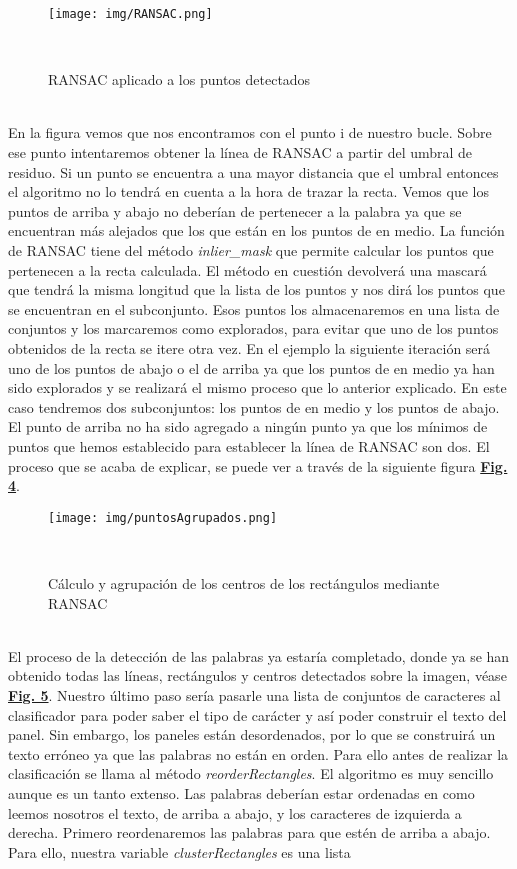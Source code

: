\documentclass[a4paper, 12pt]{article}
\begin{document}
\begin{figure}[h]
	\centering
	\texttt{[image: img/RANSAC.png]}
 	\caption{RANSAC aplicado a los puntos detectados}\
	\label{fig:normalizacion}
\end{figure}
\\ En la figura vemos que nos encontramos con el punto i de nuestro bucle. Sobre ese punto intentaremos obtener la línea de RANSAC a partir del umbral de residuo. Si un punto se encuentra a una mayor distancia que el umbral entonces el algoritmo no lo tendrá en cuenta a la hora de trazar la recta. Vemos que los puntos de arriba y abajo no deberían de pertenecer a la palabra ya que se encuentran más alejados que los que están en los puntos de en medio. La función de RANSAC tiene del método \textit{inlier\_mask} que permite calcular los puntos que pertenecen a la recta calculada. El método en cuestión devolverá una mascará que tendrá la misma longitud que la lista de los puntos y nos dirá  los puntos que se encuentran en el subconjunto. Esos puntos los almacenaremos en una lista de conjuntos y los marcaremos como explorados, para evitar que uno de los puntos obtenidos de la recta se itere otra vez. En el ejemplo la siguiente iteración será uno de los puntos de abajo o el de arriba ya que los puntos de en medio ya han sido explorados y se realizará el mismo proceso que lo anterior explicado. En este caso tendremos dos subconjuntos: los puntos de en medio y los puntos de abajo. El punto de arriba no ha sido agregado a ningún punto ya que los mínimos de puntos que hemos establecido para establecer la línea de RANSAC son dos. El proceso que se acaba de explicar, se puede ver a través de la siguiente figura \textbf{\hyperref[fig:puntosAgrupados]{Fig. 4}}.
\begin{figure}[h]
	\centering
	\texttt{[image: img/puntosAgrupados.png]}
 	\caption{Cálculo y agrupación de los centros de los rectángulos mediante RANSAC}\
	\label{fig:puntosAgrupados}
\end{figure}
\\El proceso de la detección de las palabras ya estaría completado, donde ya se han obtenido todas las líneas, rectángulos y centros detectados sobre la imagen, véase \textbf{\hyperref[fig:imagenDetectada]{Fig. 5}}. Nuestro último paso sería pasarle una lista de conjuntos de caracteres al clasificador para poder saber el tipo de carácter y así poder construir el texto del panel. Sin embargo, los paneles están desordenados, por lo que se construirá un texto erróneo ya que las palabras no están en orden. Para ello antes de realizar la clasificación se llama al método \textit{reorderRectangles}. El algoritmo es muy sencillo aunque es un tanto extenso. Las palabras deberían estar ordenadas en como leemos nosotros el texto, de arriba a abajo, y los caracteres de izquierda a derecha. Primero reordenaremos las palabras para que estén de arriba a abajo. Para ello, nuestra variable \textit{clusterRectangles} es una lista 
\end{document}

